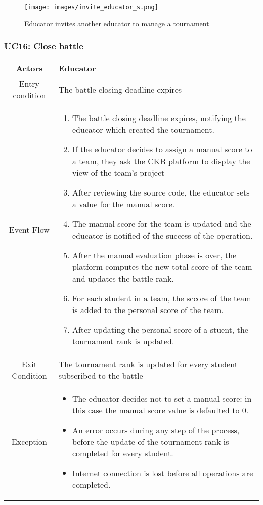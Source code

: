 \documentclass[a4paper, 11pt, titlepage]{article}
\begin{document}
\begin{figure}[h!]
    \centering
    \texttt{[image: images/invite\_educator\_s.png]}
    \caption{Educator invites another educator to manage a tournament}
    \label{fig:seq_diag_invite_educator}
    
\end{figure}

\clearpage

\subsubsection*{UC16: Close battle}

\begin{center}
    \begin{tabularx}{\linewidth} {|c|X|}
        \hline 
        Actors & Educator\\
        \hline 
        Entry condition &
        The battle closing deadline expires\\
        \hline 
        Event Flow &
        \begin{enumerate}
            \item The battle closing deadline expires, notifying the educator which created the tournament.
            \item If the educator decides to assign a manual score to a team, they ask the CKB platform to display the view of the team's project
            \item After reviewing the source code, the educator sets a value for the manual score.
            \item The manual score for the team is updated and the educator is notified of the success of the operation.
            \item After the manual evaluation phase is over, the platform computes the new total score of the team and updates the battle rank.
            \item For each student in a team, the sccore of the team is added to the personal score of the team.
            \item After updating the personal score of a stuent, the tournament rank is updated.  
        \end{enumerate}
        \\
        \hline 
        Exit Condition &
        The tournament rank is updated for every student subscribed to the battle \\
        \hline 
        Exception & 
        \begin{itemize}
            \item The educator decides not to set a manual score: in this case the manual score value is defaulted to 0.
            \item An error occurs during any step of the process, before the update of the tournament rank is completed for every student.
            \item Internet connection is lost before all operations are completed.
        \end{itemize}\\
        \hline
    \end{tabularx}
\end{center}
\end{document}
